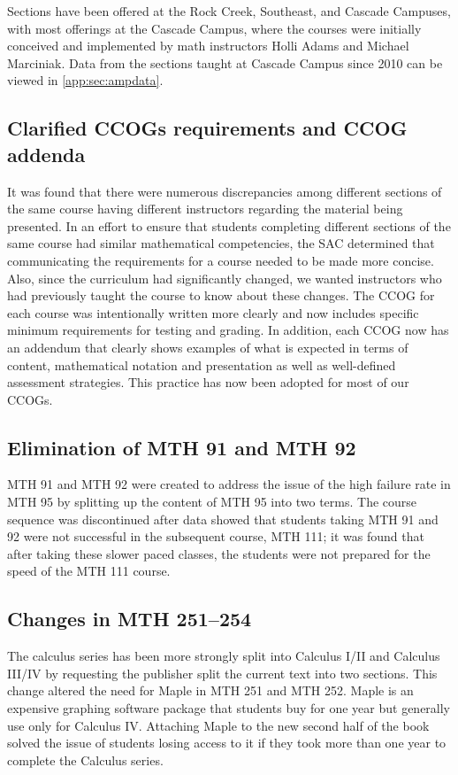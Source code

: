 Sections have been offered at the Rock Creek, Southeast, and Cascade Campuses,
with most offerings at the Cascade Campus, where the courses were initially
conceived and implemented by math instructors Holli Adams and  Michael
Marciniak. Data from the sections taught at
Cascade Campus since 2010 can be viewed in \vref{app:sec:ampdata}.

\subsection{Clarified CCOGs requirements and CCOG addenda}
It was found that there were numerous discrepancies among different sections of
the same course having different instructors regarding the material being
presented. In an effort to ensure that students completing different sections of
the same course had similar mathematical competencies, the SAC determined that
communicating the requirements for a course needed to be made more concise.
Also, since the curriculum had significantly changed, we wanted instructors who
had previously taught the course to know about these changes.  The CCOG for each
course was intentionally written more clearly and now includes specific minimum
requirements for testing and grading.  In addition, each CCOG now has an
addendum that clearly shows examples of what is expected in terms of content,
mathematical notation and presentation as well as well-defined assessment
strategies.  This practice has now been adopted for most of our CCOGs.

\subsection{Elimination of MTH 91 and MTH 92}
MTH 91 and MTH 92 were created to address the issue of the high failure rate in
MTH 95 by splitting up the content of MTH 95 into two terms.  The course
sequence was discontinued after data showed that students taking MTH 91 and 92
were not successful in the subsequent course, MTH 111; it was found that after
taking these slower paced classes, the students were not prepared for the speed
of the MTH 111 course.

\subsection{Changes in MTH 251--254}
The calculus series has been more strongly split into Calculus I/II and Calculus
III/IV by requesting the publisher split the current text into two sections.
This change altered the need for Maple in MTH 251 and MTH 252.  Maple is an
expensive graphing software package that students buy for one year but generally
use only for Calculus IV. Attaching Maple to the new second half of the book
solved the issue of students losing access to it if they took more than one year
to complete the Calculus series.


